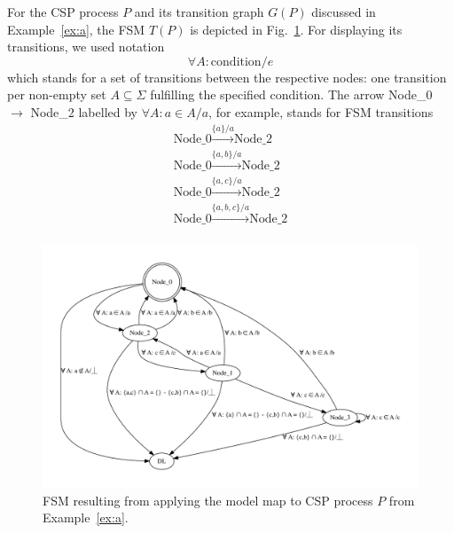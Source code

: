 \begin{example}\label{ex:b}
For the CSP process $P$ and its transition graph $G(P)$ discussed in Example~\ref{ex:a}, the FSM $T(P)$ is depicted in Fig.~\ref{fig:fsm0}. 
For displaying its transitions, we used notation
$$
\forall A: \text{condition} / e
$$
which stands for a set of transitions between the respective nodes: one transition per non-empty set $A\subseteq \Sigma$ fulfilling the specified condition.
The arrow Node\_0 $\longrightarrow$ Node\_2 labelled by $\forall A: a\in A / a$, 
for example, stands for FSM transitions
$$
\begin{array}{l}
\text{Node\_0} \xrightarrow{\{a\}/a} \text{Node\_2} \\
\text{Node\_0} \xrightarrow{\{a,b\}/a} \text{Node\_2} \\
\text{Node\_0} \xrightarrow{\{a,c\}/a} \text{Node\_2} \\
\text{Node\_0} \xrightarrow{\{a,b,c\}/a} \text{Node\_2} \\
\end{array}
$$
\xbox
\end{example}


 \begin{figure}
 \begin{center}
\includegraphics[width=\textwidth]{fsm0.pdf}
\end{center}
\caption{FSM resulting from applying the model map to CSP process $P$ from Example~\ref{ex:a}.}
 \label{fig:fsm0}
 \end{figure}

